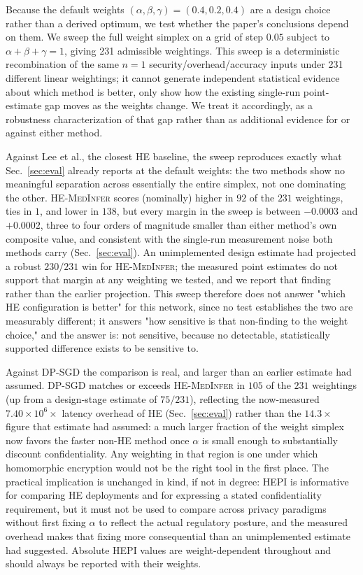 \documentclass[journal,compsoc]{IEEEtran}
\newcommand{\HEPI}{\textsc{HEPI}}          %
\newcommand{\framework}{\textsc{HE-MedInfer}}
\begin{document}
Because the default weights $(\alpha, \beta, \gamma) = (0.4, 0.2, 0.4)$ are a
design choice rather than a derived optimum, we test whether the paper's
conclusions depend on them. We sweep the full weight simplex on a grid of step
$0.05$ subject to $\alpha + \beta + \gamma = 1$, giving 231 admissible
weightings. This sweep is a deterministic recombination of the same $n=1$
security/overhead/accuracy inputs under 231 different linear weightings; it
cannot generate independent statistical evidence about which method is
better, only show how the existing single-run point-estimate gap moves as the
weights change. We treat it accordingly, as a robustness characterization of
that gap rather than as additional evidence for or against either method.

Against Lee et al., the closest HE baseline, the sweep reproduces exactly
what Sec.~\ref{sec:eval} already reports at the default weights: the two
methods show no meaningful separation across essentially the entire simplex,
not one dominating the other. \framework{} scores (nominally) higher in $92$ of
the $231$ weightings, ties in $1$, and lower in $138$, but every margin in
the sweep is between $-0.0003$ and $+0.0002$, three to four orders of
magnitude smaller than either method's own composite value, and consistent
with the single-run measurement noise both methods carry
(Sec.~\ref{sec:eval}). An unimplemented design estimate had projected a
robust $230/231$ win for \framework{}; the measured point estimates do not
support that margin at any weighting we tested, and we report that finding
rather than the earlier projection. This sweep therefore does not answer
"which HE configuration is better" for this network, since no test
establishes the two are measurably different; it answers "how sensitive is
that non-finding to the weight choice," and the answer is: not sensitive,
because no detectable, statistically supported difference exists to be
sensitive to.

Against DP-SGD the comparison is real, and larger than an earlier estimate
had assumed. DP-SGD matches or exceeds \framework{} in $105$ of the $231$
weightings (up from a design-stage estimate of $75/231$), reflecting the
now-measured $7.40 \times 10^6\times$ latency overhead of HE
(Sec.~\ref{sec:eval}) rather than the $14.3\times$ figure that estimate had
assumed: a much larger fraction of the weight simplex now favors the faster
non-HE method once $\alpha$ is small enough to substantially discount
confidentiality. Any weighting in that region is one under which homomorphic
encryption would not be the right tool in the first place. The practical
implication is unchanged in kind, if not in degree: \HEPI{} is informative
for comparing HE deployments and for expressing a stated confidentiality
requirement, but it must not be used to compare across privacy paradigms
without first fixing $\alpha$ to reflect the actual regulatory posture, and
the measured overhead makes that fixing more consequential than an
unimplemented estimate had suggested. Absolute \HEPI{} values are
weight-dependent throughout and should always be reported with their weights.
\end{document}

